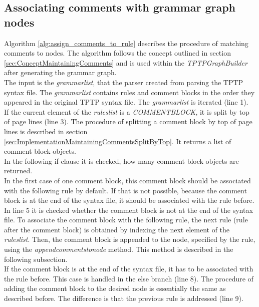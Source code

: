 \subsection{Associating comments with grammar graph nodes}\label{sec:ImplementationMaintainingCommentsAssociateWithNodes}

Algorithm \ref{alg:assign_comments_to_rule} describes the procedure of matching comments to nodes. The algorithm follows the concept outlined in section \ref{sec:ConceptMaintainingComments} and is used within the \textit{TPTPGraphBuilder} after generating the grammar graph.\\
The input is the \textit{grammar\textunderscore list}, that the parser created from parsing the \ac{TPTP} syntax file.
The \textit{grammar\textunderscore list} contains rules and comment blocks in the order they appeared in the original \ac{TPTP} syntax file.
The \textit{grammar\textunderscore list} is iterated (line 1).\\
If the current element of the \textit{rules\textunderscore list} is a \textit{COMMENT\textunderscore BLOCK}, it is split by top of page lines (line 3).
The procedure of splitting a comment block by top of page lines is described in section \ref{sec:ImplementationMaintainingCommentsSplitByTop}.
It returns a list of comment block objects.\\
In the following if-clause it is checked, how many comment block objects are returned.\\
In the first case of one comment block, this comment block should be associated with the following rule by default. If that is not possible, because the comment block is at the end of the syntax file, it should be associated with the rule before.
In line 5 it is checked whether the comment block is not at the end of the syntax file. To associate the comment block with the following rule, the next rule (rule after the comment block) is obtained by indexing the next element of the \textit{rules\textunderscore list}.
Then, the comment block is appended to the node, specified by the rule, using the \textit{append\textunderscore comments\textunderscore to\textunderscore node} method. This method is described in the following subsection.\\
If the comment block is at the end of the syntax file, it has to be associated with the rule before.
This case is handled in the else branch (line 8).
The procedure of adding the comment block to the desired node is essentially the same as described before. The difference is that the previous rule is addressed (line 9).\\
